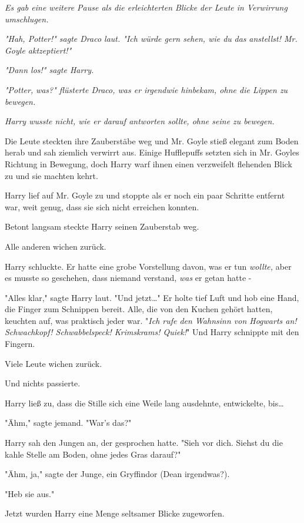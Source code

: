 {\emph{Es gab eine weitere Pause als die erleichterten Blicke der Leute in Verwirrung umschlugen.}

\emph{"Hah, Potter!" sagte Draco laut. "Ich würde gern sehen, wie du} \emph{\emph{das}} \emph{anstellst! Mr. Goyle aktzeptiert!"}

\emph{"Dann los!" sagte Harry.}

\emph{"Potter,} \emph{\emph{was?}" flüsterte Draco, was er irgendwie hinbekam, ohne die Lippen zu bewegen.}

\emph{Harry wusste nicht, wie er darauf antworten sollte, ohne seine zu bewegen.}

Die Leute steckten ihre Zauberstäbe weg und Mr. Goyle stieß elegant zum Boden herab und sah ziemlich verwirrt aus. Einige Hufflepuffs setzten sich in Mr. Goyles Richtung in Bewegung, doch Harry warf ihnen einen verzweifelt flehenden Blick zu und sie machten kehrt.

Harry lief auf Mr. Goyle zu und stoppte als er noch ein paar Schritte entfernt war, weit genug, dass sie sich nicht erreichen konnten.

Betont langsam steckte Harry seinen Zauberstab weg.

Alle anderen wichen zurück.

Harry schluckte. Er hatte eine grobe Vorstellung davon, was er tun \emph{wollte,} aber es musste so geschehen, dass niemand verstand, \emph{was} er getan hatte -

"Alles klar," sagte Harry laut. "Und jetzt…" Er holte tief Luft und hob eine Hand, die Finger zum Schnippen bereit. Alle, die von den Kuchen gehört hatten, keuchten auf, was praktisch jeder war. "\emph{Ich rufe den Wahnsinn von Hogwarts an!} \emph{\emph{Schwachkopf! Schwabbelspeck! Krimskrams! Quiek}!}" Und Harry schnippte mit den Fingern.

Viele Leute wichen zurück.

Und nichts passierte.

Harry ließ zu, dass die Stille sich eine Weile lang ausdehnte, entwickelte, bis…

"Ähm," sagte jemand. "War's das?"

Harry sah den Jungen an, der gesprochen hatte. "Sieh vor dich. Siehst du die kahle Stelle am Boden, ohne jedes Gras darauf?"

"Ähm, ja," sagte der Junge, ein Gryffindor (Dean irgendwas?).

"Heb sie aus."

Jetzt wurden Harry eine Menge seltsamer Blicke zugeworfen.

}
